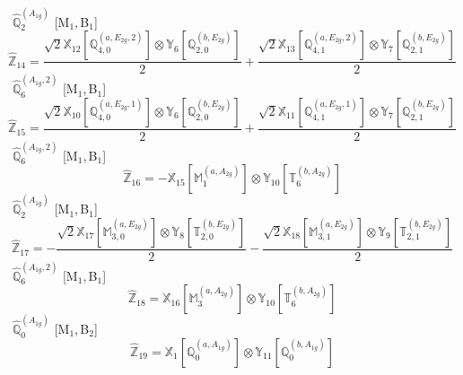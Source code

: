 \documentclass[fleqn,10pt,landscape]{article}
\begin{document}
\begin{itemize}
\begin{dmath*}
\end{dmath*}
\vspace{4mm}
\noindent {} $\,\,\,\hat{\mathbb{Q}}_{2}^{(A_{1g})}$ [M$_{1}$,\,B$_{1}$]
\begin{dmath*}
\hat{\mathbb{Z}}_{14}=\frac{\sqrt{2} \mathbb{X}_{12}[\mathbb{Q}_{4,0}^{(a,E_{2g},2)}] \otimes\mathbb{Y}_{6}[\mathbb{Q}_{2,0}^{(b,E_{2g})}]}{2} + \frac{\sqrt{2} \mathbb{X}_{13}[\mathbb{Q}_{4,1}^{(a,E_{2g},2)}] \otimes\mathbb{Y}_{7}[\mathbb{Q}_{2,1}^{(b,E_{2g})}]}{2}
\end{dmath*}
\vspace{4mm}
\noindent {} $\,\,\,\hat{\mathbb{Q}}_{6}^{(A_{1g},2)}$ [M$_{1}$,\,B$_{1}$]
\begin{dmath*}
\hat{\mathbb{Z}}_{15}=\frac{\sqrt{2} \mathbb{X}_{10}[\mathbb{Q}_{4,0}^{(a,E_{2g},1)}] \otimes\mathbb{Y}_{6}[\mathbb{Q}_{2,0}^{(b,E_{2g})}]}{2} + \frac{\sqrt{2} \mathbb{X}_{11}[\mathbb{Q}_{4,1}^{(a,E_{2g},1)}] \otimes\mathbb{Y}_{7}[\mathbb{Q}_{2,1}^{(b,E_{2g})}]}{2}
\end{dmath*}
\vspace{4mm}
\noindent {} $\,\,\,\hat{\mathbb{Q}}_{6}^{(A_{1g},2)}$ [M$_{1}$,\,B$_{1}$]
\begin{dmath*}
\hat{\mathbb{Z}}_{16}=- \mathbb{X}_{15}[\mathbb{M}_{1}^{(a,A_{2g})}] \otimes\mathbb{Y}_{10}[\mathbb{T}_{6}^{(b,A_{2g})}]
\end{dmath*}
\vspace{4mm}
\noindent {} $\,\,\,\hat{\mathbb{Q}}_{2}^{(A_{1g})}$ [M$_{1}$,\,B$_{1}$]
\begin{dmath*}
\hat{\mathbb{Z}}_{17}=- \frac{\sqrt{2} \mathbb{X}_{17}[\mathbb{M}_{3,0}^{(a,E_{2g})}] \otimes\mathbb{Y}_{8}[\mathbb{T}_{2,0}^{(b,E_{2g})}]}{2} - \frac{\sqrt{2} \mathbb{X}_{18}[\mathbb{M}_{3,1}^{(a,E_{2g})}] \otimes\mathbb{Y}_{9}[\mathbb{T}_{2,1}^{(b,E_{2g})}]}{2}
\end{dmath*}
\vspace{4mm}
\noindent {} $\,\,\,\hat{\mathbb{Q}}_{6}^{(A_{1g},2)}$ [M$_{1}$,\,B$_{1}$]
\begin{dmath*}
\hat{\mathbb{Z}}_{18}=\mathbb{X}_{16}[\mathbb{M}_{3}^{(a,A_{2g})}] \otimes\mathbb{Y}_{10}[\mathbb{T}_{6}^{(b,A_{2g})}]
\end{dmath*}
\vspace{4mm}
\noindent {} $\,\,\,\hat{\mathbb{Q}}_{0}^{(A_{1g})}$ [M$_{1}$,\,B$_{2}$]
\begin{dmath*}
\hat{\mathbb{Z}}_{19}=\mathbb{X}_{1}[\mathbb{Q}_{0}^{(a,A_{1g})}] \otimes\mathbb{Y}_{11}[\mathbb{Q}_{0}^{(b,A_{1g})}]

\end{dmath*}
\end{itemize}
\end{document}
